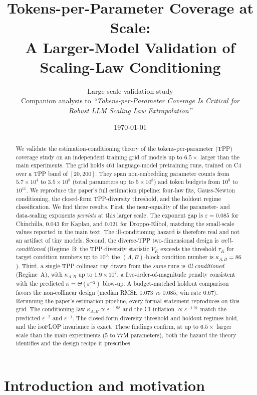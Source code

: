\documentclass[11pt]{article}
\title{\bfseries Tokens-per-Parameter Coverage at Scale:\\
A Larger-Model Validation of Scaling-Law Conditioning}
\author{Large-scale validation study\\
\normalsize Companion analysis to \emph{``Tokens-per-Parameter Coverage Is Critical for}\\
\normalsize \emph{Robust LLM Scaling Law Extrapolation''}}
\date{\today}
\newcommand{\kAB}{\kappa_{A,B}}
\begin{document}
\maketitle

\begin{abstract}
\noindent
We validate the estimation-conditioning theory of the tokens-per-parameter (TPP)
coverage study on an independent training grid of models up to $6.5\times$ larger than the main
experiments. The grid holds $461$ language-model pretraining runs, trained on C4 over a TPP band
of $[20,200]$. They span non-embedding parameter counts from $5.7\times10^{4}$ to
$3.5\times10^{8}$ (total parameters up to $5\times10^{8}$) and token budgets from $10^{8}$ to
$10^{11}$. We reproduce the paper's full estimation pipeline: four-law fits, Gauss-Newton
conditioning, the closed-form TPP-diversity threshold, and the holdout regime classification.
We find three results. First, the near-equality of the parameter- and data-scaling exponents
\emph{persists} at this larger scale. The exponent gap is $\varepsilon=0.085$ for Chinchilla,
$0.043$ for Kaplan, and $0.021$ for Droppo-Elibol, matching the small-scale values reported in
the main text. The ill-conditioning hazard is therefore real and not an artifact of tiny models.
Second, the diverse-TPP two-dimensional design is
\emph{well-conditioned} (Regime~B: the TPP-diversity statistic $V_K$ exceeds the threshold
$\tau_K$ for target condition numbers up to $10^{6}$; the $(A,B)$-block condition number is
$\kAB=86$). Third, a single-TPP collinear ray drawn from the \emph{same} runs is
\emph{ill-conditioned} (Regime~A), with $\kAB$ up to $1.9\times10^{7}$, a five-order-of-magnitude
penalty consistent with the predicted $\kappa=\Theta(\varepsilon^{-2})$ blow-up. A budget-matched
holdout comparison favors the non-collinear design (median RMSE $0.073$ vs $0.085$; win rate
$0.67$). Rerunning the paper's estimation pipeline, every formal statement reproduces on this grid.
The conditioning law $\kAB\propto\varepsilon^{-1.98}$ and the CI inflation
$\propto\varepsilon^{-1.01}$ match the predicted $\varepsilon^{-2}$ and $\varepsilon^{-1}$. The
closed-form diversity threshold and holdout regimes hold, and the isoFLOP invariance is exact.
These findings confirm, at up to $6.5\times$ larger scale than the main
experiments ($5$ to $77$M parameters), both the hazard the theory identifies and the design recipe
it prescribes.
\end{abstract}

\section{Introduction and motivation}
\label{sec:intro}
\end{document}
